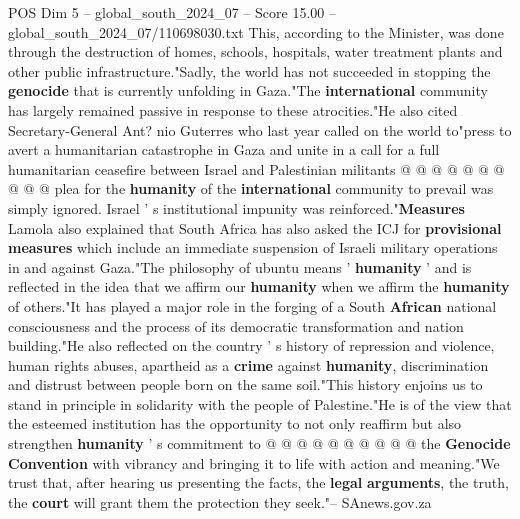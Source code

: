 \begin{textsample}{POS Dim 5 – global\_south\_2024\_07 – Score 15.00 – global\_south\_2024\_07/110698030.txt}
This, according to the Minister, was done through the destruction of homes, schools, hospitals, water treatment plants and other public infrastructure."Sadly, the world has not succeeded in stopping the \textbf{genocide} that is currently unfolding in Gaza."The \textbf{international} community has largely remained passive in response to these atrocities."He also cited Secretary-General Ant? nio Guterres who last year called on the world to"press to avert a humanitarian catastrophe in Gaza and unite in a call for a full humanitarian ceasefire between Israel and Palestinian militants @ @ @ @ @ @ @ @ @ @ plea for the \textbf{humanity} of the \textbf{international} community to prevail was simply ignored.
Israel ' s institutional impunity was reinforced."\textbf{Measures} Lamola also explained that South Africa has also asked the ICJ for \textbf{provisional} \textbf{measures} which include an immediate suspension of Israeli military operations in and against Gaza."The philosophy of ubuntu means ' \textbf{humanity} ' and is reflected in the idea that we affirm our \textbf{humanity} when we affirm the \textbf{humanity} of others."It has played a major role in the forging of a South \textbf{African} national consciousness and the process of its democratic transformation and nation building."He also reflected on the country ' s history of repression and violence, human rights abuses, apartheid as a \textbf{crime} against \textbf{humanity}, discrimination and distrust between people born on the same soil."This history enjoins us to stand in principle in solidarity with the people of Palestine."He is of the view that the esteemed institution has the opportunity to not only reaffirm but also strengthen \textbf{humanity} ' s commitment to @ @ @ @ @ @ @ @ @ @ the \textbf{Genocide} \textbf{Convention} with vibrancy and bringing it to life with action and meaning."We trust that, after hearing us presenting the facts, the \textbf{legal} \textbf{arguments}, the truth, the \textbf{court} will grant them the protection they seek."-- SAnews.gov.za

\end{textsample}
